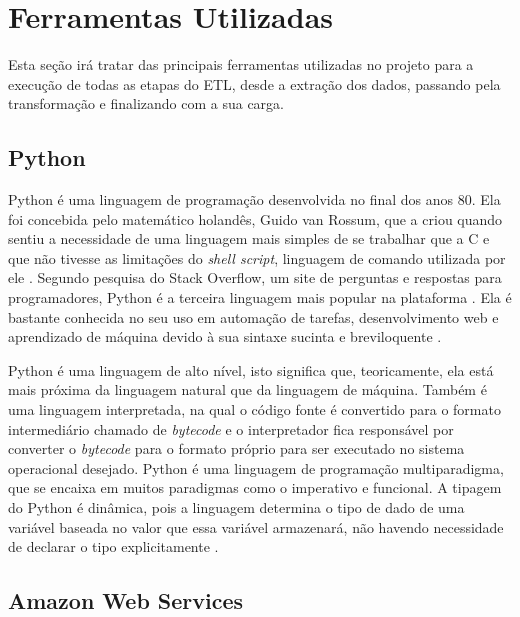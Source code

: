 \section{Ferramentas Utilizadas}
\label{sec:ferramentas}
Esta seção irá tratar das principais ferramentas utilizadas no projeto para a execução de todas as etapas do ETL, desde a extração dos dados, passando pela transformação e finalizando com a sua carga.

\subsection{Python}
\label{subsec:python}
Python é uma linguagem de programação desenvolvida no final dos anos 80. Ela foi concebida pelo matemático holandês, Guido van Rossum, que a criou quando sentiu a necessidade de uma linguagem mais simples de se trabalhar que a C e que não tivesse as limitações do \textit{shell script}, linguagem de comando utilizada por ele \cite{de2020python}. Segundo pesquisa do Stack Overflow, um site de perguntas e respostas para programadores, Python é a terceira linguagem mais popular na plataforma \cite{stackoverflow:survey}. Ela é bastante conhecida no seu uso em automação de tarefas, desenvolvimento web e aprendizado de máquina devido à sua sintaxe sucinta e breviloquente \cite{de2020python}.

Python é uma linguagem de alto nível, isto significa que, teoricamente, ela está mais próxima da linguagem natural que da linguagem de máquina. Também é uma linguagem interpretada, na qual o código fonte é convertido para o formato intermediário chamado de \textit{bytecode} e o interpretador fica responsável por converter o \textit{bytecode} para o formato próprio para ser executado no sistema operacional desejado. Python é uma linguagem de programação multiparadigma, que se encaixa em muitos paradigmas como o imperativo e funcional. A tipagem do Python é dinâmica, pois a linguagem determina o tipo de dado de uma variável baseada no valor que essa variável armazenará, não havendo necessidade de declarar o tipo explicitamente \cite{de2020python}.


\subsection{Amazon Web Services}
\label{subsec:aws}


